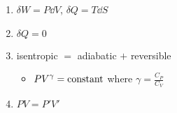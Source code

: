 

\vspace*{\fill}
\centering

\begin{enumerate}
    \item $\delta W = P\dd{V}$, $\delta Q = T\dd{S}$ 
    \item $\delta Q = 0$
    \item isentropic $=$ adiabatic $+$ reversible
        \begin{itemize}
            \item $\displaystyle PV^{\gamma} = {\rm constant}$ where $\gamma = \frac{C_{P}}{C_{V}}$
        \end{itemize}
    \item $PV = P'V'$
\end{enumerate}

\centering
\vspace*{\fill}

